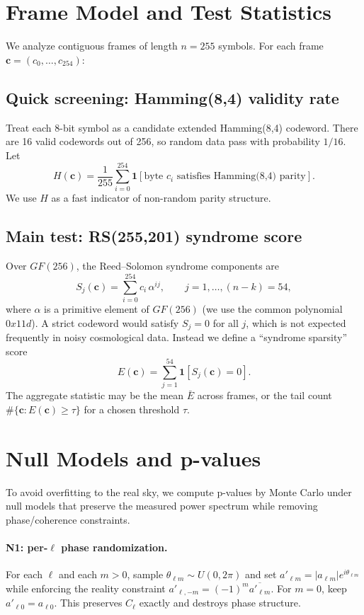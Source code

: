 \documentclass[11pt]{article}
\begin{document}
\section{Frame Model and Test Statistics}
We analyze contiguous frames of length $n=255$ symbols. For each frame $\mathbf{c}=(c_0,\dots,c_{254})$:

\subsection{Quick screening: Hamming(8,4) validity rate}
Treat each 8-bit symbol as a candidate extended Hamming(8,4) codeword. There are 16 valid codewords out of 256,
so random data pass with probability $1/16$. Let
\begin{equation}
  H(\mathbf{c}) = \frac{1}{255}\sum_{i=0}^{254} \mathbf{1}[\text{byte }c_i\text{ satisfies Hamming(8,4) parity}].
\end{equation}
We use $H$ as a fast indicator of non-random parity structure.

\subsection{Main test: RS(255,201) syndrome score}
Over $GF(256)$, the Reed--Solomon syndrome components are
\begin{equation}
  S_j(\mathbf{c}) = \sum_{i=0}^{254} c_i\,\alpha^{ij},\qquad j=1,\dots,(n-k)=54,
\end{equation}
where $\alpha$ is a primitive element of $GF(256)$ (we use the common polynomial $0x11d$).
A strict codeword would satisfy $S_j=0$ for all $j$, which is not expected frequently in noisy cosmological data.
Instead we define a ``syndrome sparsity'' score
\begin{equation}
  E(\mathbf{c}) = \sum_{j=1}^{54} \mathbf{1}[S_j(\mathbf{c})=0].
\end{equation}
The aggregate statistic may be the mean $\bar E$ across frames, or the tail count
$\#\{\mathbf{c}:E(\mathbf{c})\ge \tau\}$ for a chosen threshold $\tau$.

\section{Null Models and p-values}
To avoid overfitting to the real sky, we compute p-values by Monte Carlo under null models that preserve the measured
power spectrum while removing phase/coherence constraints.

\paragraph{N1: per-$\ell$ phase randomization.}
For each $\ell$ and each $m>0$, sample $\theta_{\ell m}\sim U(0,2\pi)$ and set
$a'_{\ell m}=|a_{\ell m}|e^{i\theta_{\ell m}}$ while enforcing the reality constraint
$a'_{\ell,-m}=(-1)^m\overline{a'_{\ell m}}$. For $m=0$, keep $a'_{\ell 0}=a_{\ell 0}$.
This preserves $C_{\ell}$ exactly and destroys phase structure.
\end{document}
